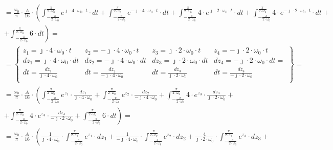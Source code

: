 \begin{task}
\begin{align*}
&=\frac{\omega_0}{\pi} \cdot \frac{A}{16} \cdot \left( \int_{-\frac{\pi}{2\cdot\omega_0}}^{\frac{\pi}{2\cdot\omega_0}} e^{\jmath \cdot 4 \cdot \omega_0 \cdot t}\cdot dt +\int_{-\frac{\pi}{2\cdot\omega_0}}^{\frac{\pi}{2\cdot\omega_0}} e^{-\jmath \cdot 4 \cdot \omega_0 \cdot t}\cdot dt +\int_{-\frac{\pi}{2\cdot\omega_0}}^{\frac{\pi}{2\cdot\omega_0}} 4\cdot e^{\jmath \cdot 2 \cdot \omega_0 \cdot t}\cdot dt +\int_{-\frac{\pi}{2\cdot\omega_0}}^{\frac{\pi}{2\cdot\omega_0}} 4\cdot e^{-\jmath \cdot 2 \cdot \omega_0 \cdot t}\cdot dt \right.+\\
&+\left. \int_{-\frac{\pi}{2\cdot\omega_0}}^{\frac{\pi}{2\cdot\omega_0}} 6\cdot dt \right)=\\
&=\begin{Bmatrix}
z_1=\jmath \cdot 4 \cdot \omega_0 \cdot t & z_2= - \jmath \cdot 4 \cdot \omega_0 \cdot t & z_3=\jmath \cdot 2 \cdot \omega_0 \cdot t & z_4= - \jmath \cdot 2 \cdot \omega_0 \cdot t \\
dz_1=\jmath \cdot 4 \cdot \omega_0 \cdot dt & dz_2= - \jmath \cdot 4 \cdot \omega_0 \cdot dt & dz_3=\jmath \cdot 2 \cdot \omega_0 \cdot dt & dz_4= - \jmath \cdot 2 \cdot \omega_0 \cdot dt=\\
dt=\frac{dz_1}{\jmath \cdot 4 \cdot \omega_0} & dt=\frac{dz_2}{- \jmath \cdot 4 \cdot \omega_0} & dt=\frac{dz_3}{\jmath \cdot 2 \cdot \omega_0} & dt=\frac{dz_4}{- \jmath \cdot 2 \cdot \omega_0} \\
\end{Bmatrix}=\\
&=\frac{\omega_0}{\pi} \cdot \frac{A}{16} \cdot \left( \int_{-\frac{\pi}{2\cdot\omega_0}}^{\frac{\pi}{2\cdot\omega_0}} e^{z_1}\cdot \frac{dz_1}{\jmath \cdot 4 \cdot \omega_0} +\int_{-\frac{\pi}{2\cdot\omega_0}}^{\frac{\pi}{2\cdot\omega_0}} e^{z_2}\cdot \frac{dz_2}{-\jmath \cdot 4 \cdot \omega_0} +\int_{-\frac{\pi}{2\cdot\omega_0}}^{\frac{\pi}{2\cdot\omega_0}} 4\cdot e^{z_3}\cdot \frac{dz_3}{\jmath \cdot 2 \cdot \omega_0} \right.+\\
&\left.+\int_{-\frac{\pi}{2\cdot\omega_0}}^{\frac{\pi}{2\cdot\omega_0}} 4\cdot e^{z_4}\cdot \frac{dz_4}{-\jmath \cdot 2 \cdot \omega_0} + \int_{-\frac{\pi}{2\cdot\omega_0}}^{\frac{\pi}{2\cdot\omega_0}} 6\cdot dt \right)=\\
&=\frac{\omega_0}{\pi} \cdot \frac{A}{16} \cdot \left(\frac{1}{\jmath \cdot 4 \cdot \omega_0} \cdot\int_{-\frac{\pi}{2\cdot\omega_0}}^{\frac{\pi}{2\cdot\omega_0}} e^{z_1}\cdot dz_1 +\frac{1}{-\jmath \cdot 4 \cdot \omega_0}\cdot \int_{-\frac{\pi}{2\cdot\omega_0}}^{\frac{\pi}{2\cdot\omega_0}} e^{z_2}\cdot dz_2 +\frac{4}{\jmath \cdot 2 \cdot \omega_0}\cdot \int_{-\frac{\pi}{2\cdot\omega_0}}^{\frac{\pi}{2\cdot\omega_0}} e^{z_3}\cdot dz_3 \right.+\\

\end{align*}
\end{task}

